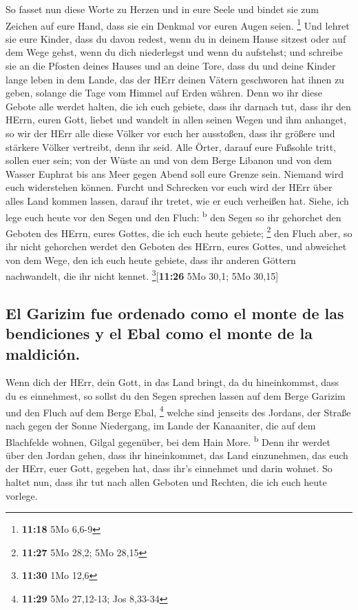  So fasset nun diese Worte zu Herzen und in eure Seele
und bindet sie zum Zeichen auf eure Hand, dass sie ein Denkmal vor euren
Augen seien. \footnote{\textbf{11:18} 5Mo 6,6-9}  Und
lehret sie eure Kinder, dass du davon redest, wenn du in deinem Hause
sitzest oder auf dem Wege gehst, wenn du dich niederlegst und wenn du
aufstehst;  und schreibe sie an die Pfosten deines Hauses
und an deine Tore,  dass du und deine Kinder lange leben
in dem Lande, das der HErr deinen Vätern geschworen hat ihnen zu geben,
solange die Tage vom Himmel auf Erden währen.  Denn wo
ihr diese Gebote alle werdet halten, die ich euch gebiete, dass ihr
darnach tut, dass ihr den HErrn, euren Gott, liebet und wandelt in allen
seinen Wegen und ihm anhanget,  so wir der HErr alle
diese Völker vor euch her ausstoßen, dass ihr größere und stärkere
Völker vertreibt, denn ihr seid.  Alle Örter, darauf eure
Fußsohle tritt, sollen euer sein; von der Wüste an und von dem Berge
Libanon und von dem Wasser Euphrat bis ans Meer gegen Abend soll eure
Grenze sein.  Niemand wird euch widerstehen können.
Furcht und Schrecken vor euch wird der HErr über alles Land kommen
lassen, darauf ihr tretet, wie er euch verheißen hat. 
Siehe, ich lege euch heute vor den Segen und den Fluch:
\textsuperscript{b}  den Segen so ihr gehorchet den
Geboten des HErrn, eures Gottes, die ich euch heute gebiete; \footnote{\textbf{11:27}
  5Mo 28,2; 5Mo 28,15}  den Fluch aber, so ihr nicht
gehorchen werdet den Geboten des HErrn, eures Gottes, und abweichet von
dem Wege, den ich euch heute gebiete, dass ihr anderen Göttern
nachwandelt, die ihr nicht kennet. \footnote{\textbf{11:30} 1Mo 12,6}{[}\textbf{11:26}
5Mo 30,1; 5Mo 30,15{]}

\hypertarget{el-garizim-fue-ordenado-como-el-monte-de-las-bendiciones-y-el-ebal-como-el-monte-de-la-maldiciuxf3n.}{%
\subsection{El Garizim fue ordenado como el monte de las bendiciones y
el Ebal como el monte de la
maldición.}\label{el-garizim-fue-ordenado-como-el-monte-de-las-bendiciones-y-el-ebal-como-el-monte-de-la-maldiciuxf3n.}}

 Wenn dich der HErr, dein Gott, in das Land bringt, da du
hineinkommst, dass du es einnehmest, so sollst du den Segen sprechen
lassen auf dem Berge Garizim und den Fluch auf dem Berge Ebal,
\footnote{\textbf{11:29} 5Mo 27,12-13; Jos 8,33-34} 
welche sind jenseits des Jordans, der Straße nach gegen der Sonne
Niedergang, im Lande der Kanaaniter, die auf dem Blachfelde wohnen,
Gilgal gegenüber, bei dem Hain More. \textsuperscript{b} 
Denn ihr werdet über den Jordan gehen, dass ihr hineinkommet, das Land
einzunehmen, das euch der HErr, euer Gott, gegeben hat, dass ihr's
einnehmet und darin wohnet.  So haltet nun, dass ihr tut
nach allen Geboten und Rechten, die ich euch heute vorlege.

